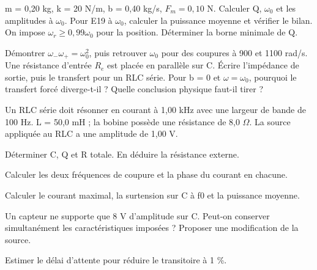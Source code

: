 m = 0,20 kg, k = 20 N/m, b = 0,40 kg/s, $F_m=0{,}10$ N. Calculer Q, $\omega_0$ et les amplitudes à $\omega_0$.
Pour E19 à $\omega_0$, calculer la puissance moyenne et vérifier le bilan.
On impose $\omega_r\geq0{,}99\omega_0$ pour la position. Déterminer la borne minimale de Q.


Démontrer $\omega_-\omega_+=\omega_0^2$, puis retrouver $\omega_0$ pour des coupures à 900 et 1100 rad/s.
Une résistance d’entrée $R_e$ est placée en parallèle sur C. Écrire l’impédance de sortie, puis le transfert pour un RLC série.
Pour b = 0 et $\omega=\omega_0$, pourquoi le transfert forcé diverge-t-il ? Quelle conclusion physique faut-il tirer ?


\label{ex-D1}
Un RLC série doit résonner en courant à 1,00 kHz avec une largeur de bande de 100 Hz. L = 50,0 mH ; la bobine possède une résistance de 8,0 $\Omega$. La source appliquée au RLC a une amplitude de 1,00 V.\begin{questions}
\item Déterminer C, Q et R totale. En déduire la résistance externe.
\item Calculer les deux fréquences de coupure et la phase du courant en chacune.
\item Calculer le courant maximal, la surtension sur C à f0 et la puissance moyenne.
\item Un capteur ne supporte que 8 V d’amplitude sur C. Peut-on conserver simultanément les caractéristiques imposées ? Proposer une modification de la source.
\item Estimer le délai d’attente pour réduire le transitoire à 1 \%.
\end{questions}


